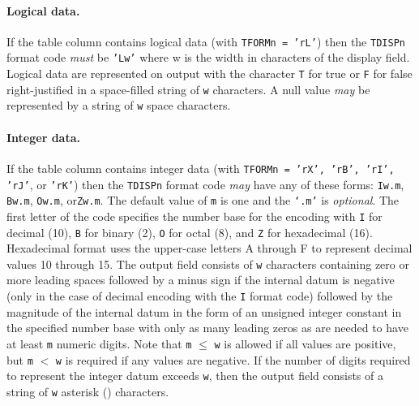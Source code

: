 \documentclass[onecolumn]{aa}
\begin{document}
 \paragraph{Logical data.} If the table column contains logical data
 (with {\tt TFORMn = 'rL'}) then the {\tt TDISPn} 
 format code {\em must} be {\tt 'Lw'\/} where w is the width in characters
 of the display field.  Logical
 data are represented on output with the character {\tt T} for true
 or {\tt F} for false right-justified in a space-filled string of
 {\tt w} characters.  A null value {\em may} be represented by a 
 string of {\tt w} space characters.

 \paragraph{Integer data.} If the table column contains integer data
 (with {\tt TFORMn = 'rX', 'rB', 'rI', 'rJ'}, or {\tt 'rK'})
 then the {\tt TDISPn} 
 format code {\em may} have any of these forms: {\tt I}{\tt w.m\/}, 
 {\tt B}{\tt w.m\/}, {\tt O}{\tt w.m\/}, or{\tt Z}{\tt w.m\/}.  The
 default value of {\tt m} is one and the {\tt `.m'} is {\em optional}.  The
 first letter of the code specifies the number base for the encoding
 with {\tt I} for decimal (10), {\tt B} for binary (2), {\tt O} for
 octal (8), and {\tt Z} for hexadecimal (16).  Hexadecimal format uses
 the upper-case letters A through F to represent decimal values 10
 through 15.  The output field consists of {\tt w} characters containing
 zero or more leading spaces followed by a minus sign if the internal datum
 is negative (only in the case of decimal encoding with the {\tt I} format code)
 followed by the magnitude of the internal datum in the form
 of an unsigned integer constant in the specified number base with only
 as many leading zeros as are needed to have at least {\tt m} numeric
 digits.  Note that {\tt m} $\leq$ {\tt w} is allowed if all values are 
 positive,
 but {\tt m} $<$ {\tt w} is required if any values are negative.  
 If the number of
 digits required to represent the integer datum exceeds {\tt w}, then the
 output field consists of a string of {\tt w} asterisk ({\tt *})
 characters.
\end{document}
